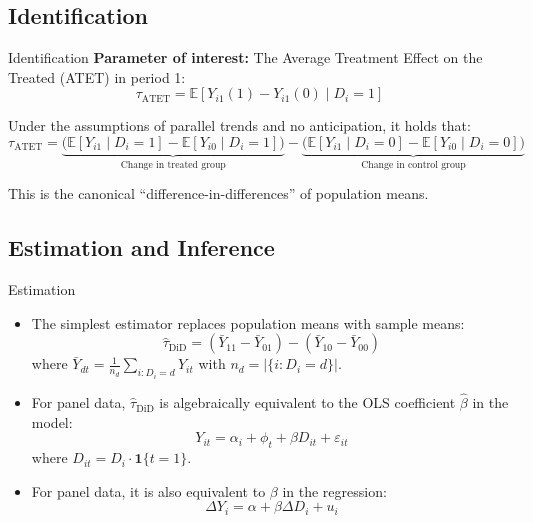 \documentclass[11pt,aspectratio=169]{beamer}
\newcommand{\E}{\mathbb{E}}
\newcommand{\ind}{\mathbf{1}}
\begin{document}
\subsection{Identification}

\begin{frame}{Identification}
\textbf{Parameter of interest:} The Average Treatment Effect on the Treated (ATET) in period 1:
\[\tau_{\text{ATET}}=\E[Y_{i1}(1)-Y_{i1}(0)\mid D_i=1]\]
\begin{theorembox}
Under the assumptions of parallel trends and no anticipation, it holds that:
\[
  \tau_{\text{ATET}}=
  \underbrace{\bigl(\E[Y_{i1}\mid D_i=1]-\E[Y_{i0}\mid D_i=1]\bigr)}_{\text{Change in treated group}}
  -\underbrace{\bigl(\E[Y_{i1}\mid D_i=0]-\E[Y_{i0}\mid D_i=0]\bigr)}_{\text{Change in control group}}
\]
\end{theorembox}
This is the canonical ``difference-in-differences'' of population means.
\end{frame}



\subsection{Estimation and Inference}

\begin{frame}{Estimation}
\begin{itemize}
  \item The simplest estimator replaces population means with sample means:
  \[\widehat\tau_{\text{DiD}}=(\bar Y_{11}-\bar Y_{01})-(\bar Y_{10}-\bar Y_{00})\]
  where $\bar Y_{dt}=\frac{1}{n_d}\sum_{i:D_i=d}Y_{it}$ with $n_d=|\{i:D_i=d\}|$.
  \item For panel data, $\widehat\tau_{\text{DiD}}$ is algebraically equivalent to the OLS coefficient $\widehat\beta$ in the  model:
  \[Y_{it}=\alpha_i+\phi_t+\beta D_{it}+\varepsilon_{it}\]
  where $D_{it}=D_i\cdot\ind\{t=1\}$.
  \item For panel data, it is also equivalent to $\beta$ in the  regression:
  \[\Delta Y_i=\alpha+\beta\Delta D_i+u_i\]
\end{itemize}
\end{frame}
\end{document}

